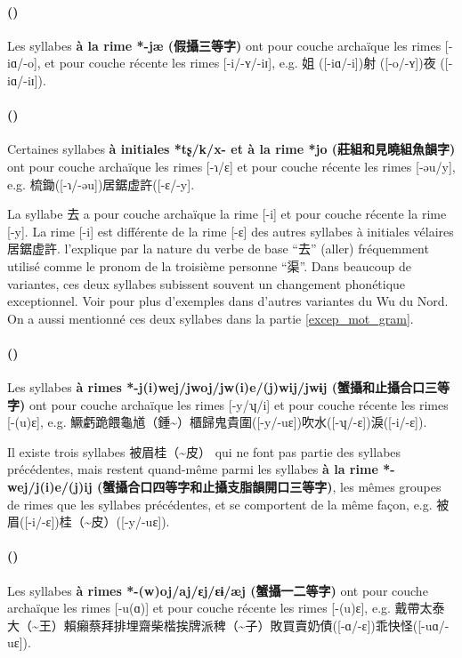\documentclass{scrbook}
\newcounter{c}[subsubsection]
\newcommand{\stpc}[1]{\stepcounter{#1}}
\newcommand{\bolang}{\textasciitilde}
\newcommand{\termyyx}[1]{\textbf{#1}}
\begin{document}
\begin{sloppypar}
\stpc{c}\paragraph{()}
Les syllabes \termyyx{à la rime *-jæ (假攝三等字)} ont pour couche archaïque les rimes [-iɑ/-o], et pour couche récente les rimes [-i/-ʏ/-iɪ], e.g. 姐 ([-iɑ/-i])射 ([-o/-ʏ])夜 ([-iɑ/-iɪ]).

\stpc{c}\paragraph{()}
Certaines syllabes \termyyx{à initiales *tʂ/k/x- et à la rime *jo (莊組和見曉組魚韻字)} ont pour couche archaïque les rimes [-ɿ/ɛ] et pour couche récente les rimes [-əu/y], e.g. 梳鋤([-ɿ/-əu])居鋸虚許([-ɛ/-y].

La syllabe 去 a pour couche archaïque la rime [-i] et pour couche récente la rime [-y]. La rime [-i] est différente de la rime [-ɛ] des autres syllabes à initiales vélaires 居鋸虚許. \textcite[33]{Chen2003yu} l'explique par la nature du verbe de base ``去'' (aller) fréquemment utilisé comme le pronom de la troisième personne ``渠''. Dans beaucoup de variantes, ces deux syllabes subissent souvent un changement phonétique exceptionnel. Voir \textcite[31]{Chen2003yu} pour plus d'exemples dans d'autres variantes du Wu du Nord. On a aussi mentionné ces deux syllabes dans la partie \ref{excep_mot_gram}.

\stpc{c}\paragraph{()}
Les syllabes \termyyx{à rimes *-j(i)wej/jwoj/jw(i)e/(j)wij/jwɨj (蟹攝和止攝合口三等字)} ont pour couche archaïque les rimes [-y/ʮ/i] et pour couche récente les rimes [-(u)ɛ], e.g. 鱖虧跪餵龜馗（鍾\bolang ）櫃歸鬼貴圍([-y/-uɛ])吹水([-ʮ/-ɛ])淚([-i/-ɛ]).

Il existe trois syllabes 被眉桂（\bolang 皮） qui ne font pas partie des syllabes précédentes, mais restent quand-même parmi les syllabes \termyyx{à la rime *-wej/j(i)e/(j)ij (蟹攝合口四等字和止攝支脂韻開口三等字)}, les mêmes groupes de rimes que les syllabes précédentes, et se comportent de la même façon, e.g. 被眉([-i/-ɛ])桂（\bolang 皮）([-y/-uɛ]).

\stpc{c}\paragraph{()}
Les syllabes \termyyx{à rimes *-(w)oj/aj/ɛj/ɛɨ/æj (蟹攝一二等字)} ont pour couche archaïque les rimes [-u(ɑ)] et pour couche récente les rimes [-(u)ɛ], e.g. 戴帶太泰大（\bolang 王）賴癩蔡拜排埋齋柴楷挨牌派稗（\bolang 子）敗買賣奶債([-ɑ/-ɛ])乖快怪([-uɑ/-uɛ]).


\end{sloppypar}
\end{document}

